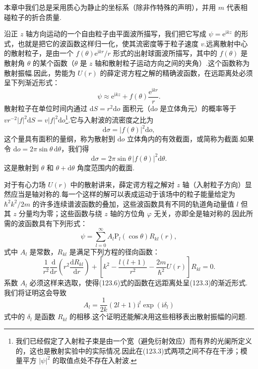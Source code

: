 本章中我们总是采用质心为静止的坐标系（除非作特殊的声明），并用 $m$ 代表相碰粒子的折合质量.

沿正 $z$ 轴方向运动的一个自由粒子由平面波所描写，我们把它写成 $\psi=\mathrm{e}^{\mathrm{i}kz}$ 的形式，也就是把它的波函数这样归一化，使其流密度等于粒子速度 $v$.远离散射中心的散射粒子，是由一个 $f(\theta)\mathrm{e}^{\mathrm{i}kr}/r$ 形式的出射球面波所描写，其中的 $f(\theta)$ 是散射角 $\theta$ 的某个函数（$\theta$ 是 $z$ 轴和散射粒子运动方向之间的夹角）.这个函数称为散射振幅.因此，势能为 $U(r)$ 的薛定谔方程之解的精确波函数，在远距离处必须呈下列渐近形式：
\begin{equation}
  \psi\approx\mathrm{e}^{\mathrm{i}kz}+f(\theta)\frac{\mathrm{e}^{\mathrm{i}kr}}{r}.
\end{equation}
散射粒子在单位时间内通过 $\mathrm{d}S=r^2\mathrm{d}o$ 面积元（$\mathrm{d}o$ 是立体角元）的概率等于 $vr^{-2}|f|^2\mathrm{d}S=v|f|^2\mathrm{d}o$\footnote{我们已经假定了入射粒子束是由一个宽（避免衍射效应）而有界的光阑所定义的，这也是散射实验中的实际情况.因此在(123.3)式两项之间不存在干涉；模量平方 $|\psi|^2$ 的取值点处不存在入射波.}.它与入射波的流密度之比为
\begin{equation}
  \mathrm{d}\sigma=|f(\theta)|^2\mathrm{d}o,
\end{equation}
这个量具有面积的量纲，称为散射到 $\mathrm{d}o$ 立体角内的有效截面，或简称为截面.如果令 $\mathrm{d}o=2\pi\sin\theta\,\mathrm{d}\theta$，我们得
\begin{equation}
  \mathrm{d}\sigma=2\pi\sin\theta\,|f(\theta)|^2\mathrm{d}\theta.
\end{equation}
这是散射到 $\theta$ 和 $\theta+\mathrm{d}\theta$ 角度范围内的截面.

对于有心力场 $U(r)$ 中的散射讲来，薛定谔方程之解对 $z$ 轴（入射粒子方向）显然应当是轴对称的.每一个这样的解可以表成运动于该场中的粒子能量给定为 $\hbar^2k^2/2m$ 的许多连续谱波函数的叠加，这些波函数具有不同的轨道角动量值 $l$ 但其 $z$ 分量均为零；这些函数与绕 $z$ 轴的方位角 $\varphi$ 无关，亦即全是轴对称的.因此所需的波函数具有下列形式：
\begin{equation}
  \psi=\sum_{l=0}^{\infty}A_l\mathrm{P}_l(\cos\theta)R_{kl}(r),
\end{equation}
式中 $A_l$ 是常数，$R_{kl}$ 是满足下列方程的径向函数：
\begin{equation}
  \frac{1}{r^2}\frac{\mathrm{d}}{\mathrm{d}r}
  \left(r^2\frac{\mathrm{d}R_{kl}}{\mathrm{d}r}\right)
  +\left[k^2-\frac{l(l+1)}{r^2}-\frac{2m}{\hbar^2}U(r)\right]R_{kl}=0.
\end{equation}
系数 $A_l$ 必须这样来选取，使得(123.6)式的函数在远距离处呈(123.3)的渐近形式.我们将证明这会导致
\begin{equation}
  A_l=\frac{1}{2k}(2l+1)\mathrm{i}^l\exp(\mathrm{i}\delta_l)
\end{equation}
式中的 $\delta_l$ 是函数 $R_{kl}$ 的相移.这个证明还能解决用这些相移表出散射振幅的问题.

